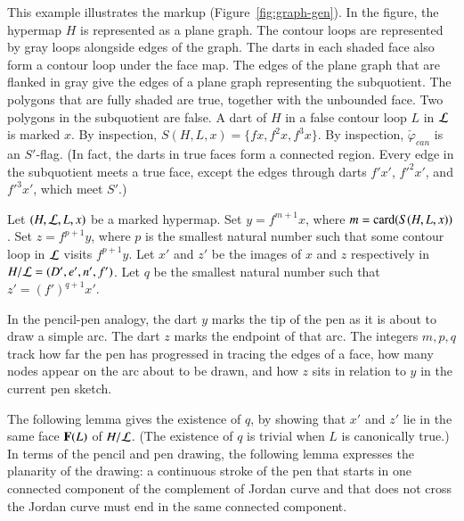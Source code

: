 \begin{example}[illustration]\label{ex:graph-gen}  \hspace{-5pt}
  This example illustrates the markup (Figure~\ref{fig:graph-gen}).
  In the figure, the hypermap $H$ is represented as a plane graph.
  The contour loops are represented by gray loops alongside edges
  of the  graph.  The darts in each shaded face also form a contour loop
  under the face map.  The edges of the plane graph that are flanked in gray
  give the edges of a plane
  graph representing the subquotient.  The polygons that are fully shaded
  are true, together with the unbounded face.
  Two polygons in the subquotient are false.  A dart of $H$ in
  a false contour loop $L$ in ${\cal L}$ is marked $x$.  By inspection,
  $S(H,L,x)=\{f x,f^2 x,f^3 x\}$.  By inspection,
  $\check\varphi_{can}$ is an $S'$-flag.  (In fact, the darts in true
  faces form a connected region.  Every edge in the subquotient meets a true face, except
  the edges through darts $f'x'$, $f'^{2} x'$, and $f'^{3} x'$, which meet $S'$.)
\end{example}

\figALMINNP %



\begin{definition}[$m$,~$p$,~$q$,~$y$,~$z$]\label{def:yz}
Let $(H,{\cal L},L,x)$ be a marked hypermap.
Set  $y = f^{m+1} x$, where $m = {\operatorname{card}}(S(H,L,x))$.
  Set
$z=f^{p+1} y$, where $p$ is the smallest natural number 
such that some contour loop in ${\cal L}$ visits $f^{p+1} y$.
Let $x'$ and $z'$ be the images of $x$ and $z$ respectively in $H/{\cal L} = (D',e',n',f')$.
Let $q$ be the smallest natural number such that $z' = (f')^{q+1} x'$.  
\end{definition}
%
%
%
%

In the pencil-pen analogy, the dart $y$ marks the tip of the pen as it
is about to draw a simple arc. The dart $z$ marks the endpoint of that
arc.  The integers $m,p,q$ track how far the pen has progressed in
tracing the edges of a face, how many nodes appear on the arc about to
be drawn, and how $z$ sits in relation to $y$ in the current pen
sketch.

The following lemma gives the existence of $q$, by showing that
$x'$ and $z'$ lie in the same face ${\mathbf F}(L)$ of $H/{\cal L}$.  (The
existence of $q$ is trivial when $L$ is canonically true.)  In terms
of the pencil and pen drawing, the following
lemma expresses the planarity of the drawing:
a continuous stroke of the pen that starts in one connected component of
the complement of Jordan curve and that does not cross the Jordan
curve must end in the same connected component.

